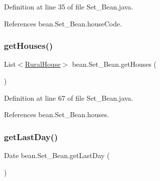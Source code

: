 Definition at line 35 of file Set\+\_\+\+Bean.\+java.


\begin{DoxyCode}{0}

\end{DoxyCode}


References bean.\+Set\+\_\+\+Bean.\+house\+Code.

\mbox{\label{classbean_1_1Set__Bean_adb0d58588e1704cbc2eeb74ead53175c}} 
\subsubsection{\texorpdfstring{getHouses()}{getHouses()}}
{\footnotesize\ttfamily List$<$\mbox{\hyperlink{classdomain_1_1RuralHouse}{Rural\+House}}$>$ bean.\+Set\+\_\+\+Bean.\+get\+Houses (\begin{DoxyParamCaption}{ }\end{DoxyParamCaption})}



Definition at line 67 of file Set\+\_\+\+Bean.\+java.


\begin{DoxyCode}{0}

\end{DoxyCode}


References bean.\+Set\+\_\+\+Bean.\+houses.

\mbox{\label{classbean_1_1Set__Bean_ad9e455b4a923d74204c2d8d3ea4d99cb}} 
\subsubsection{\texorpdfstring{getLastDay()}{getLastDay()}}
{\footnotesize\ttfamily Date bean.\+Set\+\_\+\+Bean.\+get\+Last\+Day (\begin{DoxyParamCaption}{ }\end{DoxyParamCaption})}



